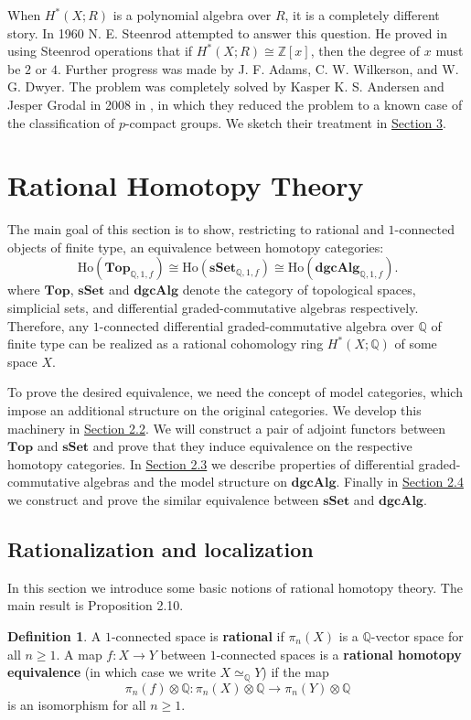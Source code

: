 \documentclass[psamsfonts]{amsart}
\theoremstyle{definition}
\newtheorem{defn}{Definition}[section]
\newcommand{\Q}{\mathbb{Q}}
\newcommand{\Z}{\mathbb{Z}}
\newcommand{\Top}{\mathbf{Top}}
\newcommand{\sSet}{\mathbf{sSet}}
\newcommand{\dgcAlg}{\mathbf{dgcAlg}}
\newcommand{\Ho}{\mathrm{Ho}}
\numberwithin{equation}{section}
\begin{document}
When $H^\ast(X;R)$ is a polynomial algebra over $R$, it is a completely different story. In 1960 N. E. Steenrod attempted to answer this question. He proved in \cite{Steenrod} using Steenrod operations that if $H^\ast(X;R)\cong\Z[x]$, then the degree of $x$ must be $2$ or $4$. Further progress was made by J. F. Adams, C. W. Wilkerson, and W. G. Dwyer. The problem was completely solved by Kasper K. S. Andersen and Jesper Grodal in 2008 in \cite{Andersen-Grodal}, in which they reduced the problem to a known case of the classification of $p$-compact groups. We sketch their treatment in \hyperref[Section 3]{Section 3}.

\section{Rational Homotopy Theory}\label{Section 2}

The main goal of this section is to show, restricting to rational and $1$-connected objects of finite type, an equivalence between homotopy categories:
\[\Ho(\Top_{\Q,1,f})\cong\Ho(\sSet_{\Q,1,f})\cong\Ho(\dgcAlg_{\Q,1,f}).\]
where $\Top$, $\sSet$ and $\dgcAlg$ denote the category of topological spaces, simplicial sets, and differential graded-commutative algebras respectively.
Therefore, any $1$-connected differential graded-commutative algebra over $\Q$ of finite type can be realized as a rational cohomology ring $H^\ast(X;\Q)$ of some space $X$.

To prove the desired equivalence, we need the concept of model categories, which impose an additional structure on the original categories. We develop this machinery in \hyperref[Section 2.2]{Section 2.2}. We will construct a pair of adjoint functors between $\Top$ and $\sSet$ and prove that they induce equivalence on the respective homotopy categories. In \hyperref[Section 2.3]{Section 2.3} we describe properties of differential graded-commutative algebras and the model structure on $\dgcAlg$. Finally in \hyperref[Section 2.4]{Section 2.4} we construct and prove the similar equivalence between $\sSet$ and $\dgcAlg$.

\subsection{Rationalization and localization}

In this section we introduce some basic notions of rational homotopy theory. The main result is Proposition 2.10.

\begin{defn}
A $1$-connected space is \textbf{rational} if $\pi_n(X)$ is a $\Q$-vector space for all $n\geq1$. A map $f:X\to Y$ between $1$-connected spaces is a \textbf{rational homotopy equivalence} (in which case we write $X\simeq_\Q Y$) if the map
\[\pi_n(f)\otimes\Q:\pi_n(X)\otimes\Q\to\pi_n(Y)\otimes\Q\]
is an isomorphism for all $n\geq1$.
\end{defn}
\end{document}
